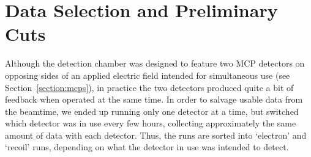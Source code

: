 
\section{Data Selection and Preliminary Cuts}
Although the detection chamber was designed to feature two MCP detectors on opposing sides of an applied electric field intended for simultaneous use (see Section~\ref{section:mcps}), %
in practice the two detectors produced quite a bit of feedback when operated at the same time.  In order to salvage usable data from the beamtime, we ended up running only one detector at a time, but switched which detector was in use every few hours, collecting approximately the same amount of data with each detector.  Thus, the runs are sorted into `electron' and `recoil' runs, depending on what the detector in use was intended to detect.  

